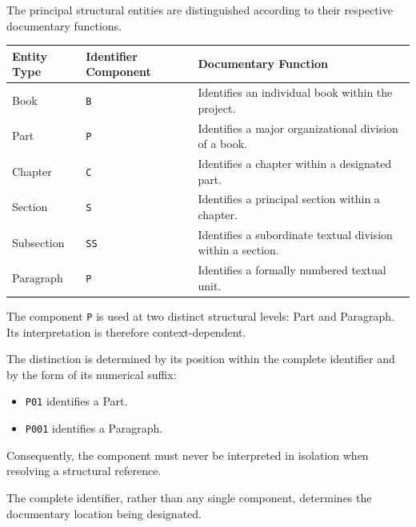 The principal structural entities are distinguished
according to their respective documentary functions.

\begin{center}
\small
\setlength{\tabcolsep}{4pt}
\begin{tabularx}{\textwidth}{
    >{\raggedright\arraybackslash}p{}
    >{\raggedright\arraybackslash}p{}
    >{\raggedright\arraybackslash}X
}
\toprule
\textbf{Entity Type} &
\textbf{Identifier Component} &
\textbf{Documentary Function}
\\
\midrule

Book
&
\texttt{B}
&
Identifies an individual book within the project.
\\

Part
&
\texttt{P}
&
Identifies a major organizational division of a book.
\\

Chapter
&
\texttt{C}
&
Identifies a chapter within a designated part.
\\

Section
&
\texttt{S}
&
Identifies a principal section within a chapter.
\\

Subsection
&
\texttt{SS}
&
Identifies a subordinate textual division within a section.
\\

Paragraph
&
\texttt{P}
&
Identifies a formally numbered textual unit.
\\
\bottomrule
\end{tabularx}
\end{center}

The component \texttt{P} is used at two distinct structural
levels: Part and Paragraph. Its interpretation is therefore
context-dependent.

The distinction is determined by its position within the
complete identifier and by the form of its numerical suffix:

\begin{itemize}
    \item \texttt{P01} identifies a Part.
    \item \texttt{P001} identifies a Paragraph.
\end{itemize}

Consequently, the component must never be interpreted
in isolation when resolving a structural reference.

The complete identifier, rather than any single component,
determines the documentary location being designated.


